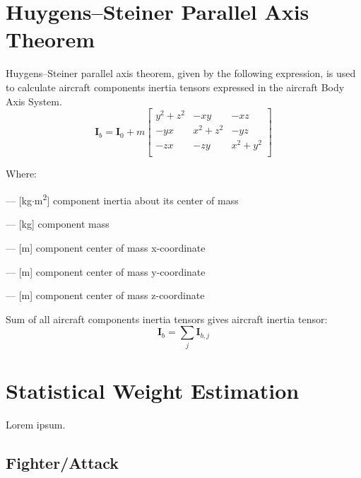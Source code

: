 \section{Huygens–Steiner Parallel Axis Theorem}

Huygens–Steiner parallel axis theorem, given by the following expression, is used to calculate aircraft components inertia tensors expressed in the aircraft Body Axis System. \cite{Awrejcewicz2012}
\begin{equation}
  \label{eq-mass-steiners}
  {\boldsymbol I}_b
  =
  {\boldsymbol I}_0
  +
  m
  \left[
    \begin{matrix}
      y^2 + z^2 &       -xy &       -xz \\
            -yx & x^2 + z^2 &       -yz \\
            -zx &       -zy & x^2 + y^2 \\
    \end{matrix}
  \right]
\end{equation}

\noindent Where:
\begin{description}[align=right,labelwidth=1cm]
  \item [${\boldsymbol I}_0$] --- [kg$\cdot$m\textsuperscript{2}] component inertia about its center of mass
  \item [$m$] --- [kg] component mass
  \item [$x$] --- [m] component center of mass x-coordinate
  \item [$y$] --- [m] component center of mass y-coordinate
  \item [$z$] --- [m] component center of mass z-coordinate
\end{description}

Sum of all aircraft components inertia tensors gives aircraft inertia tensor:
\begin{equation}
  {\boldsymbol I}_{b} = \sum_{j} {\boldsymbol I}_{b,j}
\end{equation}

\section{Statistical Weight Estimation}

Lorem ipsum. \cite{NASA-TP-2015-218751,Raymer2018}

\subsection{Fighter/Attack}

